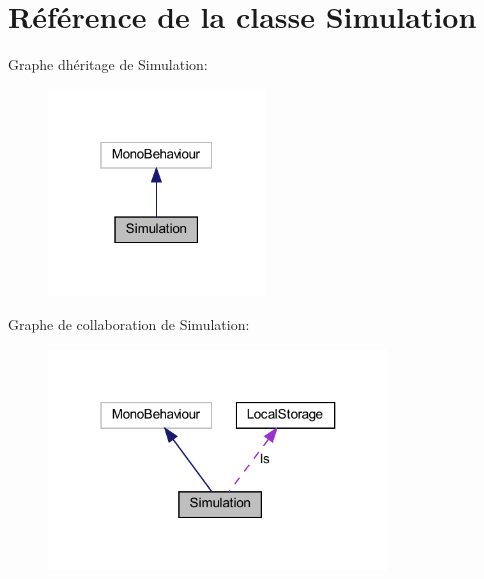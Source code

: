 \hypertarget{class_simulation}{}\section{Référence de la classe Simulation}
\label{class_simulation}


 




Graphe d\textquotesingle{}héritage de Simulation\+:
\nopagebreak
\begin{figure}[H]
\begin{center}
\leavevmode
\includegraphics[width=163pt]{class_simulation__inherit__graph}
\end{center}
\end{figure}


Graphe de collaboration de Simulation\+:
\nopagebreak
\begin{figure}[H]
\begin{center}
\leavevmode
\includegraphics[width=256pt]{class_simulation__coll__graph}
\end{center}
\end{figure}
